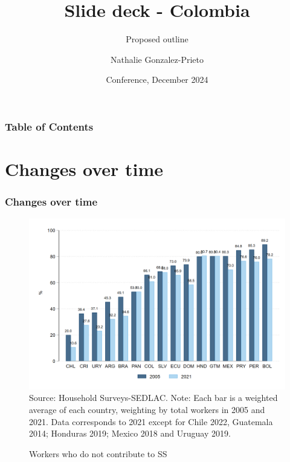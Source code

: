 \documentclass{beamer}
\title[Slide deck - Colombia] %
{Slide deck - Colombia}
\subtitle{Proposed outline}
\author{Nathalie Gonzalez-Prieto} %
\institute{World Bank} %
\date[WB 2024] %
{Conference, December 2024}
\begin{document}
\frame{\titlepage}


\begin{frame}
\frametitle{Table of Contents}
\tableofcontents
\end{frame}


\section{Changes over time}


\begin{frame}
\frametitle{Changes over time}
\begin{figure}[!htb]
    \justifying
     \caption{Workers who do not contribute to SS}     
     \includegraphics[width=0.5\linewidth]{latex/figures/Snapshot/snapshot_informal_ss.png}
    \label{fig:SalariedSS}
    \footnotesize{Source: Household Surveys-SEDLAC.}
    \footnotesize{Note: Each bar is a weighted average of each country, weighting by total workers in 2005 and 2021.  Data corresponds to 2021 except for Chile 2022, Guatemala 2014; Honduras 2019; Mexico 2018 and Uruguay 2019.}
\end{figure}
    
\end{frame}

\end{document}
